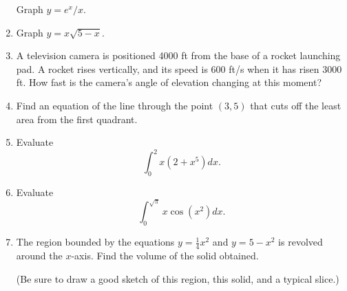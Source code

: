 \documentclass[12pt]{article}
\begin{document}
\begin{enumerate}[(1)]
Graph $y = e^x/x$.

\item
Graph $y = x \sqrt{5 - x}$.

\item
A television camera is positioned 4000 ft from the base of a rocket launching pad.
A rocket rises vertically, and its speed is 600 ft/s when it has risen 3000 ft. How fast
is the camera's angle of elevation changing at this moment?

\item
Find an equation of the line through the point $(3, 5)$ that cuts off the least area
from the first quadrant.

\item
Evaluate
$$\int_0^2 x(2 + x^5) dx.$$

\item
Evaluate
$$\int_0^{\sqrt{\pi}} x \cos(x^2) dx.$$

\item
The region bounded by the equations $y = \frac{1}{4} x^2$ and $y = 5 - x^2$ is revolved around the $x$-axis.
Find the volume of the solid obtained.

(Be sure to draw a good sketch of this region, this solid, and a typical slice.)

\end{enumerate}
\end{document}
